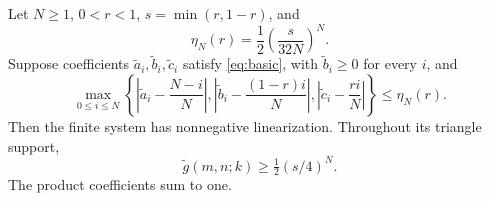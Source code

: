 \begin{theorem}\label{thm:perturbation}
Let $N\geq1$, $0<r<1$, $s=\min(r,1-r)$, and
\begin{equation}\label{eq:radius}
\eta_N(r)=\frac12\left(\frac{s}{32N}\right)^N.
\end{equation}
Suppose coefficients $\widetilde a_i,\widetilde b_i,\widetilde c_i$ satisfy \eqref{eq:basic}, with $\widetilde b_i\geq0$ for every $i$, and
\begin{equation}\label{eq:closeness}
\max_{0\leq i\leq N}\left\{
\left|\widetilde a_i-\frac{N-i}{N}\right|,
\left|\widetilde b_i-\frac{(1-r)i}{N}\right|,
\left|\widetilde c_i-\frac{ri}{N}\right|\right\}\leq\eta_N(r).
\end{equation}
Then the finite system has nonnegative linearization. Throughout its triangle support,
\[
\widetilde g(m,n;k)\geq\tfrac12(s/4)^N.
\]
The product coefficients sum to one.
\end{theorem}
